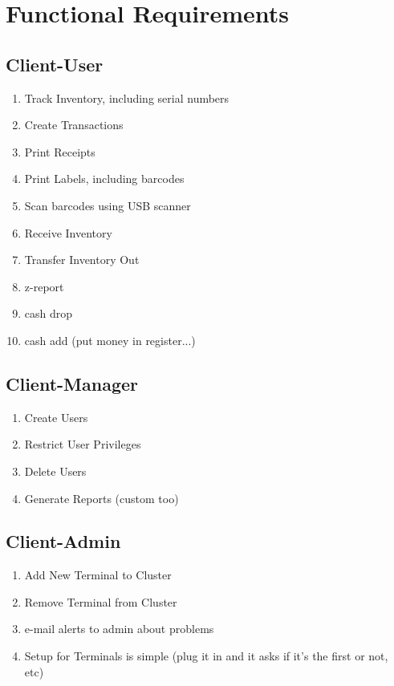 \chapter{Functional Requirements}
\label{01_FuncReqs}

\section{Client-User}
\begin{enumerate}
	\item Track Inventory, including serial numbers
	\item Create Transactions
	\item Print Receipts
	\item Print Labels, including barcodes
	\item Scan barcodes using USB scanner
	\item Receive Inventory
	\item Transfer Inventory Out
	\item z-report
	\item cash drop
	\item cash add (put money in register...)
\end{enumerate}

\section{Client-Manager}
\begin{enumerate}
	\item Create Users
	\item Restrict User Privileges
	\item Delete Users
	\item Generate Reports (custom too)
\end{enumerate}

\section{Client-Admin}
\begin{enumerate}
	\item Add New Terminal to Cluster
	\item Remove Terminal from Cluster
	\item e-mail alerts to admin about problems
	\item Setup for Terminals is simple (plug it in and it asks if it's the first or not, etc)
\end{enumerate}

